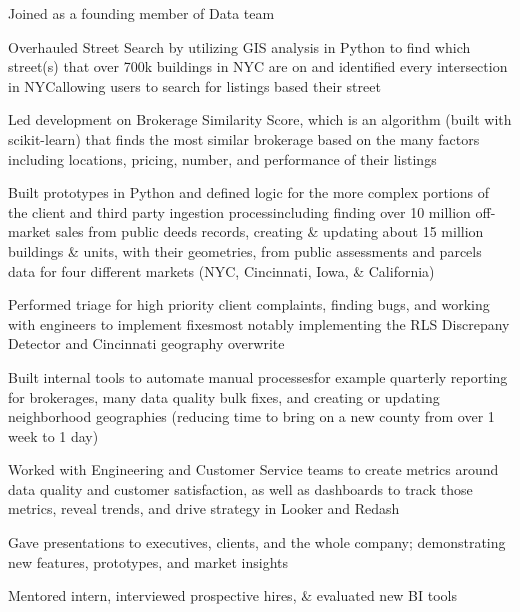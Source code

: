 \documentclass[a4paper]{deedy-resume-openfont} %
\begin{document}
\begin{minipage}[t]{0.66\textwidth}
\vspace{\topsep} %
\begin{tightitemize}
	\item Joined as a founding member of Data team
    \item Overhauled Street Search by utilizing GIS analysis in Python to find which street(s) that over 700k buildings in NYC are on and identified every intersection in NYC\textemdash allowing users to search for listings based their street
    \item Led development on Brokerage Similarity Score, which is an algorithm (built with scikit-learn) that finds the most similar brokerage based on the many factors including locations, pricing, number, and performance of their listings
    \item Built prototypes in Python and defined logic for the more complex portions of the client and third party ingestion process\textemdash including finding over 10 million off-market sales from public deeds records, creating \& updating about 15 million buildings \& units, with their geometries, from public assessments and parcels data for four different markets (NYC, Cincinnati, Iowa, \& California)
    \item Performed triage for high priority client complaints, finding bugs, and working with engineers to implement fixes\textemdash most notably implementing the RLS Discrepany Detector and Cincinnati geography overwrite
    \item Built internal tools to automate manual processes\textemdash for example quarterly reporting for brokerages, many data quality bulk fixes, and creating or updating neighborhood geographies (reducing time to bring on a new county from over 1 week to 1 day)
    \item Worked with Engineering and Customer Service teams to create metrics around data quality and customer satisfaction, as well as dashboards to track those metrics, reveal trends, and drive strategy in Looker and Redash
    \item Gave presentations to executives, clients, and the whole company; demonstrating new features, prototypes, and market insights
    \item Mentored intern, interviewed prospective hires, \& evaluated new BI tools
\end{tightitemize}


\end{minipage}
\end{document}
